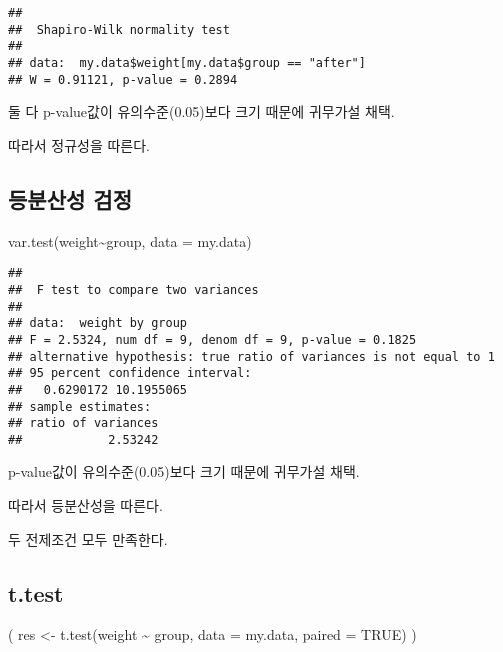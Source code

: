 \documentclass[
]{article}
\newenvironment{Shaded}{\begin{snugshade}}{\end{snugshade}}
\newcommand{\AttributeTok}[1]{\textcolor[rgb]{0.77,0.63,0.00}{#1}}
\newcommand{\ConstantTok}[1]{\textcolor[rgb]{0.00,0.00,0.00}{#1}}
\newcommand{\FunctionTok}[1]{\textcolor[rgb]{0.00,0.00,0.00}{#1}}
\newcommand{\NormalTok}[1]{#1}
\newcommand{\OtherTok}[1]{\textcolor[rgb]{0.56,0.35,0.01}{#1}}
\newcommand{\SpecialCharTok}[1]{\textcolor[rgb]{0.00,0.00,0.00}{#1}}
\begin{document}
\begin{verbatim}
## 
##  Shapiro-Wilk normality test
## 
## data:  my.data$weight[my.data$group == "after"]
## W = 0.91121, p-value = 0.2894
\end{verbatim}

둘 다 p-value값이 유의수준(0.05)보다 크기 때문에 귀무가설 채택.

따라서 정규성을 따른다.

\hypertarget{uxb4f1uxbd84uxc0b0uxc131-uxac80uxc815}{%
\subsection{등분산성 검정}\label{uxb4f1uxbd84uxc0b0uxc131-uxac80uxc815}}

\begin{Shaded}
\begin{Highlighting}[]
\FunctionTok{var.test}\NormalTok{(weight}\SpecialCharTok{\textasciitilde{}}\NormalTok{group, }\AttributeTok{data =}\NormalTok{ my.data)}
\end{Highlighting}
\end{Shaded}

\begin{verbatim}
## 
##  F test to compare two variances
## 
## data:  weight by group
## F = 2.5324, num df = 9, denom df = 9, p-value = 0.1825
## alternative hypothesis: true ratio of variances is not equal to 1
## 95 percent confidence interval:
##   0.6290172 10.1955065
## sample estimates:
## ratio of variances 
##            2.53242
\end{verbatim}

p-value값이 유의수준(0.05)보다 크기 때문에 귀무가설 채택.

따라서 등분산성을 따른다.

두 전제조건 모두 만족한다.

\hypertarget{t.test-1}{%
\subsection{t.test}\label{t.test-1}}

\begin{Shaded}
\begin{Highlighting}[]
\NormalTok{( res }\OtherTok{\textless{}{-}} \FunctionTok{t.test}\NormalTok{(weight }\SpecialCharTok{\textasciitilde{}}\NormalTok{ group, }\AttributeTok{data =}\NormalTok{ my.data, }\AttributeTok{paired =} \ConstantTok{TRUE}\NormalTok{) )}
\end{Highlighting}
\end{Shaded}
\end{document}
